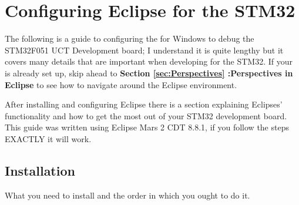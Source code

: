 \section{Configuring Eclipse for the STM32}
\label{sec:eclipseconfig}
The following is a guide to configuring the  for Windows to debug the STM32F051 UCT Development board; I understand it is quite lengthy but it covers many details that are important when developing for the STM32. If your  is already set up, skip ahead to \textbf{Section \ref{sec:Perspectives} :Perspectives in Eclipse} to see how to navigate around the Eclipse environment.
\par
After installing and configuring Eclipse there is a section explaining Eclipses' functionality and how to get the most out of your STM32 development board. This guide was written using Eclipse Mars 2 CDT 8.8.1, if you follow the steps EXACTLY it will work.
\subsection{Installation}
What you need to install and the order in which you ought to do it.
